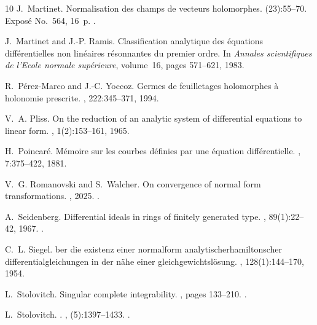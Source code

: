 \documentclass[10pt,twoside,reqno]{amsart}
\theoremstyle{remark}
\theoremstyle{remark}
\begin{document}
\begin{thebibliography}{10}
	J.~Martinet.
	\newblock Normalisation des champs de vecteurs holomorphes.
	\newblock (23):55--70.
	\newblock Expos\'e No.\ 564, 16~p.
	\newblock \href {https://doi.org/10.1007/BFb0097189}
	{}.
	
	J.~Martinet and J.-P. Ramis.
	\newblock Classification analytique des {\'e}quations diff{\'e}rentielles non
	lin{\'e}aires r{\'e}sonnantes du premier ordre.
	\newblock In {\em Annales scientifiques de l'Ecole normale sup{\'e}rieure},
	volume~16, pages 571--621, 1983.
	
	R.~P{\'e}rez-Marco and J.-C. Yoccoz.
	\newblock Germes de feuilletages holomorphes {\`a} holonomie prescrite.
	, 222:345--371, 1994.
	
	V.~A. Pliss.
	\newblock On the reduction of an analytic system of differential equations to
	linear form.
	, 1(2):153--161, 1965.
	
	H.~Poincar{\'e}.
	\newblock M{\'e}moire sur les courbes d{\'e}finies par une {\'e}quation
	diff{\'e}rentielle.
	,
	7:375--422, 1881.
	
	V.~G. Romanovski and S.~Walcher.
	\newblock On convergence of normal form transformations.
	, 2025.
	\newblock \href {https://arxiv.org/abs/2510.00925} {}.
	
	A.~Seidenberg.
	\newblock Differential ideals in rings of finitely generated type.
	, 89(1):22--42, 1967.
	\newblock \href {https://doi.org/10.2307/2373093} {}.
	
	C.~L. Siegel.
	ber die existenz einer normalform analytischerhamiltonscher
	differentialgleichungen in der n{\"a}he einer gleichgewichtsl{\"o}sung.
	, 128(1):144--170, 1954.
	
	L.~Stolovitch.
	\newblock Singular complete integrability.
	, pages 133--210.
	\newblock \href {https://doi.org/10.1007/s10240-000-8182-4}
	{}.
	
	L.~Stolovitch.
	.
	, (5):1397--1433.
	\newblock \href {https://doi.org/10.5802/aif.1439}
	{}.
	
\end{thebibliography}
\end{document}
